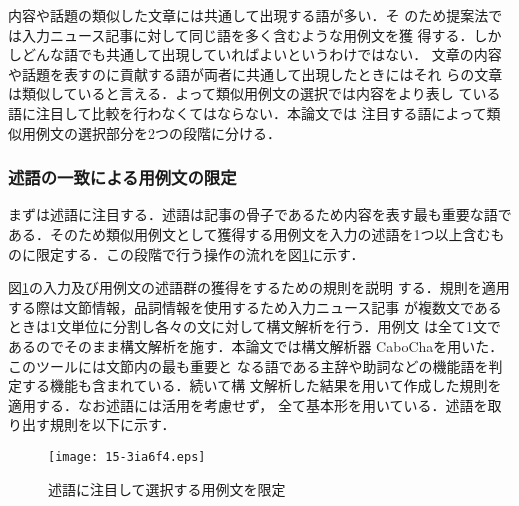 \documentclass[japanese]{jnlp_1.4}
\def\toolref#1{}
\begin{document}
内容や話題の類似した文章には共通して出現する語が多い．そ
のため提案法では入力ニュース記事に対して同じ語を多く含むような用例文を獲
得する．しかしどんな語でも共通して出現していればよいというわけではない．
文章の内容や話題を表すのに貢献する語が両者に共通して出現したときにはそれ
らの文章は類似していると言える．よって類似用例文の選択では内容をより表し
ている語に注目して比較を行わなくてはならない．本論文では
注目する語によって類似用例文の選択部分を2つの段階に分ける．


\subsubsection{述語の一致による用例文の限定}

まずは述語に注目する．述語は記事の骨子であるため内容を表す最も重要な語で
ある．そのため類似用例文として獲得する用例文を入力の述語を1つ以上含むも
のに限定する．この段階で行う操作の流れを図\ref{図:類似用例1}に示す．

図\ref{図:類似用例1}の入力及び用例文の述語群の獲得をするための規則を説明
する．規則を適用する際は文節情報，品詞情報を使用するため入力ニュース記事
が複数文であるときは1文単位に分割し各々の文に対して構文解析を行う．用例文
は全て1文であるのでそのまま構文解析を施す．本論文では構文解析器
CaboCha\toolref{ツール:cabocha}を用いた．このツールには文節内の最も重要と
なる語である主辞や助詞などの機能語を判定する機能も含まれている．続いて構
文解析した結果を用いて作成した規則を適用する．なお述語には活用を考慮せず，
全て基本形を用いている．述語を取り出す規則を以下に示す．

\begin{figure}[t]
\begin{center}
\texttt{[image: 15-3ia6f4.eps]}
 \caption{述語に注目して選択する用例文を限定} \label{図:類似用例1}
 \end{center}
\end{figure}
\end{document}
